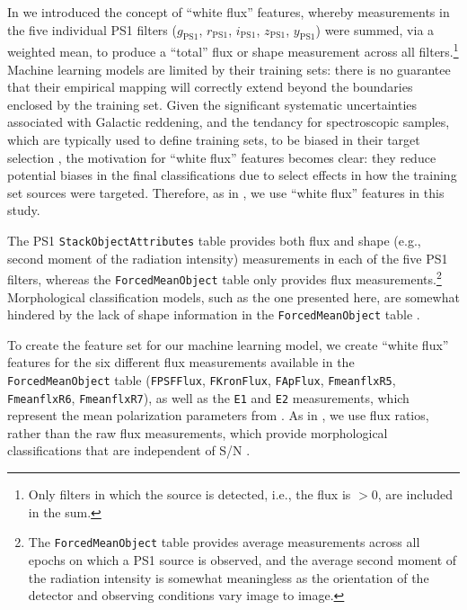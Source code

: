 \documentclass[twocolumn]{aastex63}
\begin{document}
In \citet{Tachibana18} we introduced the concept of ``white flux'' features,
whereby measurements in the five individual PS1 filters ($g_\mathrm{PS1}$,
$r_\mathrm{PS1}$, $i_\mathrm{PS1}$, $z_\mathrm{PS1}$, $y_\mathrm{PS1}$) were
summed, via a weighted mean, to produce a ``total'' flux or shape measurement
across all filters.\footnote{Only filters in which the source is detected,
i.e., the flux is $> 0$, are included in the sum.} Machine learning models are
limited by their training sets: there is no guarantee that their empirical
mapping will correctly extend beyond the boundaries enclosed by the training
set. Given the significant systematic uncertainties associated with Galactic
reddening, and the tendancy for spectroscopic samples, which are typically
used to define training sets, to be biased in their target selection
\citep[see e.g.,][]{Miller17}, the motivation for ``white flux'' features
becomes clear: they reduce potential biases in the final classifications due
to select effects in how the training set sources were targeted. Therefore, as
in \citet{Tachibana18}, we use ``white flux'' features in this study.

The PS1 \texttt{StackObjectAttributes} table provides both flux and shape
(e.g., second moment of the radiation intensity) measurements in each of the
five PS1 filters, whereas the \texttt{ForcedMeanObject} table only provides
flux measurements.\footnote{The \texttt{ForcedMeanObject} table provides
average measurements across all epochs on which a PS1 source is observed, and
the average second moment of the radiation intensity is somewhat meaningless
as the orientation of the detector and observing conditions vary image to
image.} Morphological classification models, such as the one presented here,
are somewhat hindered by the lack of shape information in the
\texttt{ForcedMeanObject} table \citep[see for example the different shape
features in Figure~2 of][]{Tachibana18}. 

To create the feature set for our machine learning model, we create ``white
flux'' features for the six different flux measurements available in the
\texttt{ForcedMeanObject} table (\texttt{FPSFFlux}, \texttt{FKronFlux},
\texttt{FApFlux}, \texttt{FmeanflxR5}, \texttt{FmeanflxR6},
\texttt{FmeanflxR7}), as well as the \texttt{E1} and \texttt{E2} measurements,
which represent the mean polarization parameters from \citet{Kaiser95}. As in
\citet{Tachibana18}, we use flux ratios, rather than the raw flux
measurements, which provide morphological classifications that are independent
of S/N \citep{Lupton01}.
\end{document}
